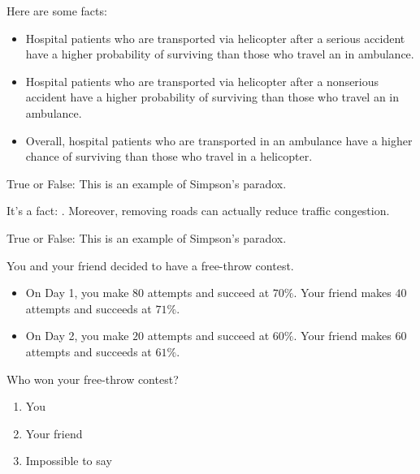 \documentclass[nooutcomes,noauthor]{ximera}
\author{Bart Snapp}
\begin{document}
\maketitle



\begin{exercise}
  Here are some facts:
  \begin{itemize}
      \item Hospital patients who are transported via helicopter
        after a serious accident have a higher probability of
        surviving than those who travel an in ambulance.
      \item Hospital patients who are transported via helicopter
        after a nonserious accident have a higher probability of
        surviving than those who travel an in ambulance.
      \item Overall, hospital patients who are transported in an
        ambulance have a higher chance of surviving than those who travel in a helicopter.
  \end{itemize}
        
  
  True or False: This is an example of Simpson's paradox.
 
\end{exercise}




\begin{exercise}
  It's a fact: . Moreover,
  removing roads can actually reduce traffic congestion.

  
  True or False: This is an example of Simpson's paradox.

\end{exercise}

\begin{exercise}
  You and your friend decided to have a free-throw contest.
  \begin{itemize}
  \item On Day 1, you make $80$ attempts and succeed at $70\%$. Your friend makes $40$ attempts and succeeds at $71\%$.
  \item On Day 2, you make $20$ attempts and succeed at $60\%$. Your friend makes $60$ attempts and succeeds at $61\%$.
  \end{itemize}
  Who won your free-throw contest?
  \begin{enumerate}
  \item You
  \item Your friend
  \item Impossible to say
  \end{enumerate}

\end{exercise}
\end{document}

